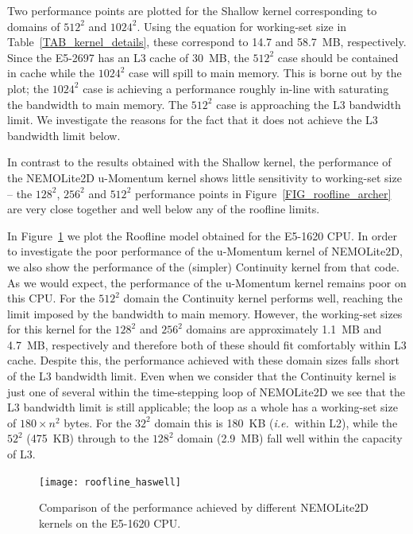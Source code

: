 \documentclass[12pt]{article}
\begin{document}
Two performance points are plotted for the Shallow kernel
corresponding to domains of $512^2$ and $1024^2$. Using the equation
for working-set size in Table~\ref{TAB_kernel_details}, these
correspond to 14.7 and 58.7~MB, respectively. Since the E5-2697 has an
L3 cache of 30~MB, the $512^2$ case should be contained in cache while
the $1024^2$ case will spill to main memory. This is borne out by the
plot; the $1024^2$ case is achieving a performance roughly in-line
with saturating the bandwidth to main memory. The $512^2$ case is
approaching the L3 bandwidth limit. We investigate the reasons for the
fact that it does not achieve the L3 bandwidth limit below.
 
In contrast to the results obtained with the Shallow kernel, the
performance of the NEMOLite2D u-Momentum kernel shows little
sensitivity to working-set size -- the $128^2$, $256^2$ and $512^2$
performance points in Figure~\ref{FIG_roofline_archer} are very close
together and well below any of the roofline limits.

In Figure~\ref{FIG_roofline_haswell} we plot the Roofline model
obtained for the E5-1620 CPU. In order to investigate the poor
performance of the u-Momentum kernel of NEMOLite2D, we also show the
performance of the (simpler) Continuity kernel from that code. As we
would expect, the performance of the u-Momentum kernel remains poor on
this CPU. For the $512^2$ domain the Continuity kernel performs well,
reaching the limit imposed by the bandwidth to main memory. However,
the working-set sizes for this kernel for the $128^2$ and $256^2$
domains are approximately 1.1~MB and 4.7~MB, respectively and
therefore both of these should fit comfortably within L3
cache. Despite this, the performance achieved with these domain sizes
falls short of the L3 bandwidth limit.  Even when we consider that the
Continuity kernel is just one of several within the time-stepping loop
of NEMOLite2D we see that the L3 bandwidth limit is still applicable;
the loop as a whole has a working-set size of $180\times n^{2}$
bytes. For the $32^2$ domain this is 180~KB ({\it i.e.}\ within L2),
while the $52^2$ (475~KB) through to the $128^2$ domain (2.9~MB) fall
well within the capacity of L3.

\begin{figure}
\centering
\texttt{[image: roofline\_haswell]}
\caption{Comparison of the performance achieved by different
  NEMOLite2D kernels on the E5-1620 CPU.}
\label{FIG_roofline_haswell}
\end{figure}
\end{document}
